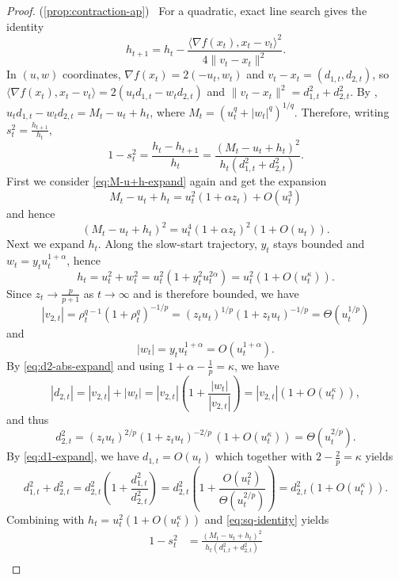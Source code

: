 \documentclass{article}
\newcommand{\norm}[1]{\|#1\|}
\newcommand{\ip}[1]{\langle #1 \rangle}
\newcommand{\newtarget}[1]{\hypertarget{#1}{}}
\newcommand\linkofproof[1]{(\cref{#1})\newtarget{proof:#1}\ }
\begin{document}
\begin{proof}\linkofproof{prop:contraction-ap}
    For a quadratic, exact line search gives the identity
    \[
        h_{t+1} = h_t - \frac{\ip{\nabla f(x_t),x_t-v_t}^2}{4\norm{v_t-x_t}^2}.
    \]
    In $(u,w)$ coordinates, $\nabla f(x_t)=2(-u_t,w_t)$ and $v_t-x_t=(d_{1,t},d_{2,t})$,
    so $\ip{\nabla f(x_t),x_t-v_t}=2(u_t d_{1,t}-w_t d_{2,t})$ and
    $\norm{v_t-x_t}^2=d_{1,t}^2+d_{2,t}^2$.
    By , $u_t d_{1,t}-w_t d_{2,t}=M_t-u_t+h_t$, where
    $M_t=(u_t^q+|w_t|^q)^{1/q}$.
    Therefore, writing $s_t^2= \frac{h_{t+1}}{h_t}$,
    \begin{equation}\label{eq:sq-identity}
        1-s_t^2
        = \frac{h_t - h_{t+1}}{h_t}
        = \frac{(M_t-u_t+h_t)^2}{h_t(d_{1,t}^2+d_{2,t}^2)}.
    \end{equation}
    First we consider \eqref{eq:M-u+h-expand} again and get the expansion
    \[
        M_t-u_t+h_t = u_t^2(1+\alpha z_t)+O(u_t^3)
    \]
    and hence
    \[
        (M_t-u_t+h_t)^2=u_t^4(1+\alpha z_t)^2(1+O(u_t)).
    \]
    Next we expand $h_t$.
    Along the slow-start trajectory, $y_t$ stays bounded and
    $w_t=y_t u_t^{1+\alpha}$, hence
    \begin{equation}
        \label{eq:h-expand}
        h_t=u_t^2 + w_t^2 = u_t^2(1+y_t^2u_t^{2\alpha})= u_t^2(1+O(u_t^\kappa)).
    \end{equation}
    Since $z_t \to \frac{p}{p+1}$ as $t\to\infty$ and is therefore bounded, we have
    \[
        |v_{2,t}|=\rho_t^{q-1}(1+\rho_t^q)^{-1/p}=(z_t u_t)^{1/p}(1+z_t u_t)^{-1/p} = \Theta(u_t^{1/p})
    \]
    and
    \[
        |w_t|=y_t u_t^{1+\alpha}=O(u_t^{1+\alpha}).
    \]
    By \eqref{eq:d2-abs-expand} and using $1+\alpha - \frac{1}{p} = \kappa$, we have
    \[
        |d_{2,t}|=|v_{2,t}|+|w_t| = |v_{2,t}| \left(1+\frac{|w_t|}{|v_{2,t}|}\right) = |v_{2,t}|(1+O(u_t^\kappa)),
    \]
    and thus
    \[
        d_{2,t}^2 = (z_t u_t)^{2/p}(1+z_t u_t)^{-2/p}\,(1+O(u_t^\kappa)) = \Theta(u_t^{2/p}).
    \]
    By \eqref{eq:d1-expand}, we have $d_{1,t}=O(u_t)$ which together with $2-\frac{2}{p}=\kappa$ yields
    \[
        d_{1,t}^2 + d_{2,t}^2 = d_{2,t}^2 \left(1 + \frac{d_{1,t}^2}{d_{2,t}^2} \right)
        = d_{2,t}^2 \left( 1 + \frac{O(u_t^2)}{\Theta(u_t^{2/p})} \right) = d_{2,t}^2(1+O(u_t^\kappa)).
    \]
    Combining with $h_t=u_t^2(1+O(u_t^\kappa))$ and \eqref{eq:sq-identity} yields
    \begin{align*}
        1-s_t^2
        &= \frac{(M_t-u_t+h_t)^2}{h_t(d_{1,t}^2+d_{2,t}^2)} \\

\end{align*}
\end{proof}
\end{document}
